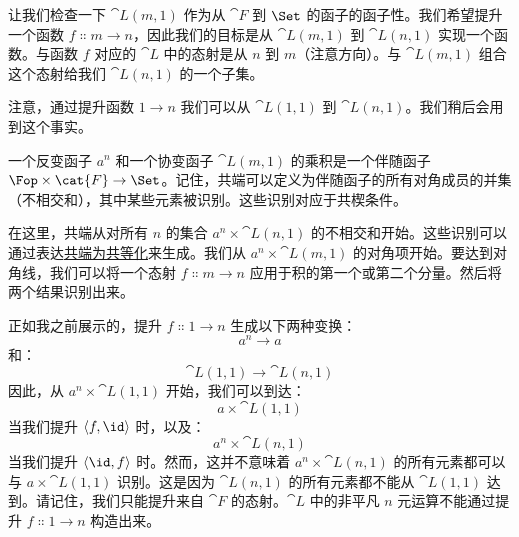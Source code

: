 让我们检查一下 $\cat{L}(m, 1)$ 作为从 $\cat{F}$ 到 $\Set$ 的函子的函子性。我们希望提升一个函数 $f \Colon m \to n$，因此我们的目标是从 $\cat{L}(m, 1)$ 到 $\cat{L}(n, 1)$ 实现一个函数。与函数 $f$ 对应的 $\cat{L}$ 中的态射是从 $n$ 到 $m$（注意方向）。与 $\cat{L}(m, 1)$ 组合这个态射给我们 $\cat{L}(n, 1)$ 的一个子集。

\begin{figure}[H]
  \centering
\end{figure}

注意，通过提升函数 $1 \to n$ 我们可以从 $\cat{L}(1, 1)$ 到 $\cat{L}(n, 1)$。我们稍后会用到这个事实。

一个反变函子 $a^n$ 和一个协变函子 $\cat{L}(m, 1)$ 的乘积是一个伴随函子 $\Fop \times \cat{F} \to \Set$。记住，共端可以定义为伴随函子的所有对角成员的并集（不相交和），其中某些元素被识别。这些识别对应于共楔条件。

在这里，共端从对所有 $n$ 的集合 $a^n \times \cat{L}(n, 1)$ 的不相交和开始。这些识别可以通过表达\hyperref[ends-and-coends]{共端为共等化}来生成。我们从 $a^n \times \cat{L}(m, 1)$ 的对角项开始。要达到对角线，我们可以将一个态射 $f \Colon m \to n$ 应用于积的第一个或第二个分量。然后将两个结果识别出来。

\begin{figure}[H]
  \centering
\end{figure}

正如我之前展示的，提升 $f \Colon 1 \to n$ 生成以下两种变换：
\[a^n \to a\]
和：
\[\cat{L}(1, 1) \to \cat{L}(n, 1)\]
因此，从 $a^n \times \cat{L}(1, 1)$ 开始，我们可以到达：
\[a \times \cat{L}(1, 1)\]
当我们提升 $\langle f, \id \rangle$ 时，以及：
\[a^n \times \cat{L}(n, 1)\]
当我们提升 $\langle \id, f \rangle$ 时。然而，这并不意味着 $a^n \times \cat{L}(n, 1)$ 的所有元素都可以与 $a \times \cat{L}(1, 1)$ 识别。这是因为 $\cat{L}(n, 1)$ 的所有元素都不能从 $\cat{L}(1, 1)$ 达到。请记住，我们只能提升来自 $\cat{F}$ 的态射。$\cat{L}$ 中的非平凡 $n$ 元运算不能通过提升 $f \Colon 1 \to n$ 构造出来。

